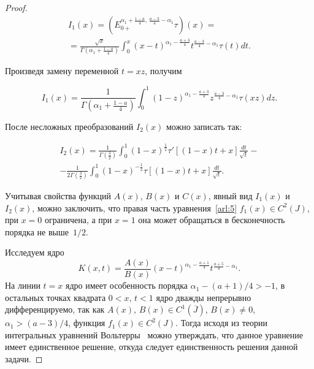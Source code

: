 \begin{proof}
\begin{multline*}
I_1(x)=\left(E^{\alpha_1+\frac{1-a}{4},\,\frac{a-3}{4}-\alpha_1}_{0+}\tau\right)(x)=

\\

=\frac{\sqrt{x}}{\Gamma\left(\alpha_1+\frac{1-a}{4}\right)}\int_{0}^{x}(x-t)^{\alpha_1-\frac{a+3}{4}}t^{\frac{a-3}{4}-\alpha_1}\tau(t)dt.


\end{multline*} 

Произведя замену переменной $t=xz$, получим

$$

I_1(x)=\frac{1}{\Gamma\left(\alpha_1+\frac{1-a}{4}\right)}\int_{0}^{1}(1-z)^{\alpha_1-\frac{a+3}{4}}z^{\frac{a-3}{4}-\alpha_1}\tau(xz)dz.

$$

После несложных преобразований $I_2(x)$ можно записать так:

\begin{multline*}

I_2(x)=\frac{1}{\Gamma\left(\frac 32\right)}\int_{0}^{1}(1-x)^{\frac 12}\tau'[(1-x)t+x]\frac{dt}{\sqrt{t}}-

\\-\frac{1}{2\Gamma\left(\frac 32\right)}\int_{0}^{1}(1-x)^{-\frac 12}\tau[(1-x)t+x]\frac{dt}{\sqrt{t}}.


\end{multline*}



Учитывая свойства функций $A(x)$, $B(x)$ и $C(x)$, явный вид $I_1(x)$ и $I_2(x)$, можно заключить, что правая часть уравнения~\eqref{arl:5} $f_1(x)\in C^2(J)$, при $x=0$ ограничена, а при $x=1$ она может обращаться в бесконечность порядка не выше~$1/2$.



Исследуем ядро $$K(x,t)=\frac{A(x)}{B(x)}(x-t)^{\alpha_1-\frac{a+1}{4}}t^{\frac{a+5}{4}-\alpha_1}.$$ На линии $t=x$ ядро имеет особенность порядка $\alpha_1-({a+1})/{4}>-1$, в остальных точках квадрата $0<x$, $t<1$  ядро дважды непрерывно дифференцируемо, так как $A(x)$, $B(x)\in C^1(\overline{J})$, $B(x)\neq 0$, $\alpha_1>({a-3})/{4}$, функция $f_1(x)\in C^2(J)$. Тогда исходя из теории интегральных уравнений Вольтерры~\cite{arl:bib:6, arl:bib:7} можно утверждать, что данное уравнение имеет единственное решение, откуда следует единственность решения данной задачи.\end{proof}



